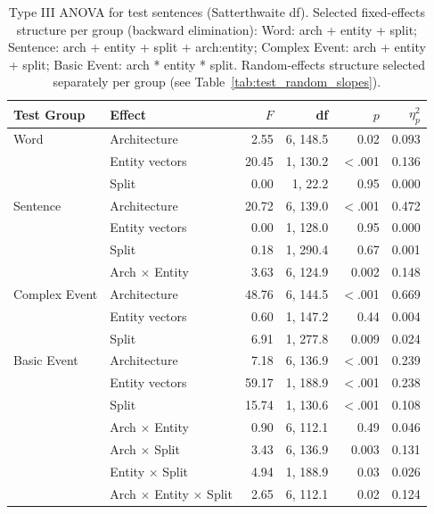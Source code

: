 \begin{table}[t]
\centering\small
\begin{tabular}{@{}llrrrr@{}}
\toprule
\textbf{Test Group} & \textbf{Effect} & $F$ & \textbf{df} & $p$ & $\eta^2_p$ \\
\midrule
Word & Architecture & 2.55 & 6, 148.5 & 0.02 & 0.093 \\
 & Entity vectors & 20.45 & 1, 130.2 & $<$.001 & 0.136 \\
 & Split & 0.00 & 1, 22.2 & 0.95 & 0.000 \\
\addlinespace
Sentence & Architecture & 20.72 & 6, 139.0 & $<$.001 & 0.472 \\
 & Entity vectors & 0.00 & 1, 128.0 & 0.95 & 0.000 \\
 & Split & 0.18 & 1, 290.4 & 0.67 & 0.001 \\
 & Arch $\times$ Entity & 3.63 & 6, 124.9 & 0.002 & 0.148 \\
\addlinespace
Complex Event & Architecture & 48.76 & 6, 144.5 & $<$.001 & 0.669 \\
 & Entity vectors & 0.60 & 1, 147.2 & 0.44 & 0.004 \\
 & Split & 6.91 & 1, 277.8 & 0.009 & 0.024 \\
\addlinespace
Basic Event & Architecture & 7.18 & 6, 136.9 & $<$.001 & 0.239 \\
 & Entity vectors & 59.17 & 1, 188.9 & $<$.001 & 0.238 \\
 & Split & 15.74 & 1, 130.6 & $<$.001 & 0.108 \\
 & Arch $\times$ Entity & 0.90 & 6, 112.1 & 0.49 & 0.046 \\
 & Arch $\times$ Split & 3.43 & 6, 136.9 & 0.003 & 0.131 \\
 & Entity $\times$ Split & 4.94 & 1, 188.9 & 0.03 & 0.026 \\
 & Arch $\times$ Entity $\times$ Split & 2.65 & 6, 112.1 & 0.02 & 0.124 \\
\bottomrule
\end{tabular}
\caption{Type III ANOVA for test sentences (Satterthwaite df). Selected fixed-effects structure per group (backward elimination): Word: arch + entity + split; Sentence: arch + entity + split + arch:entity; Complex Event: arch + entity + split; Basic Event: arch * entity * split. Random-effects structure selected separately per group (see Table~\ref{tab:test_random_slopes}).}
\label{tab:test_anova}
\end{table}
